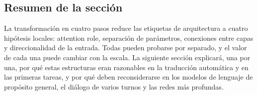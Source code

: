 
\subsection{Resumen de la sección}

La transformación en cuatro pasos reduce las etiquetas de arquitectura a cuatro hipótesis locales: attention role, separación de parámetros, conexiones entre capas y direccionalidad de la entrada. Todas pueden probarse por separado, y el valor de cada una puede cambiar con la escala. La siguiente sección explicará, una por una, por qué estas estructuras eran razonables en la traducción automática y en las primeras tareas, y por qué deben reconsiderarse en los modelos de lenguaje de propósito general, el diálogo de varios turnos y las redes más profundas.
